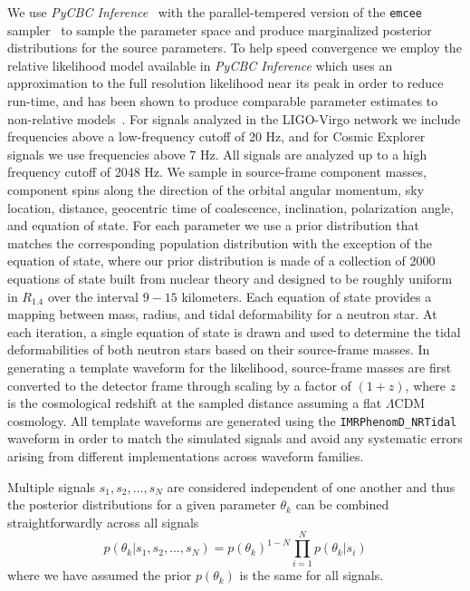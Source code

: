 We use \textit{PyCBC Inference}~\cite{Biwer_2019} with the parallel-tempered version of the \texttt{emcee} sampler~\cite{Foreman_Mackey_2013,Vousden_2015,2010CAMCS...5...65G} to sample the parameter space and produce marginalized posterior distributions for the source parameters. To help speed convergence we employ the relative likelihood model available in \textit{PyCBC Inference} which uses an approximation to the full resolution likelihood near its peak in order to reduce run-time, and has been shown to produce comparable parameter estimates to non-relative models~\cite{Cornish:2010kf,Zackay:2018qdy,Finstad:2020sok}. For signals analyzed in the LIGO-Virgo network we include frequencies above a low-frequency cutoff of 20 Hz, and for Cosmic Explorer signals we use frequencies above 7 Hz. All signals are analyzed up to a high frequency cutoff of 2048 Hz.
We sample in source-frame component masses, component spins along the direction of the orbital angular momentum, sky location, distance, geocentric time of coalescence, inclination, polarization angle, and equation of state. For each parameter we use a prior distribution that matches the corresponding population distribution with the exception of the equation of state, where our prior distribution is made of a collection of 2000 equations of state built from nuclear theory and designed to be roughly uniform in $R_{1.4}$ over the interval $9-15$ kilometers. Each equation of state provides a mapping between mass, radius, and tidal deformability for a neutron star. At each iteration, a single equation of state is drawn and used to determine the tidal deformabilities of both neutron stars based on their source-frame masses. In generating a template waveform for the likelihood, source-frame masses are first converted to the detector frame through scaling by a factor of $(1+z)$, where $z$ is the cosmological redshift at the sampled distance assuming a flat $\Lambda$CDM cosmology. All template waveforms are generated using the \texttt{IMRPhenomD\_NRTidal} waveform in order to match the simulated signals and avoid any systematic errors arising from different implementations across waveform families.


Multiple signals $s_{1},s_{2},\ldots,s_{N}$ are considered independent of one another and thus the posterior distributions for a given parameter $\theta_{k}$ can be combined straightforwardly across all signals~\cite{DelPozzo:2013ala,Agathos:2015uaa}
\begin{equation}
    p(\theta_{k}|s_{1},s_{2},\ldots,s_{N})=p(\theta_{k})^{1-N}\prod_{i=1}^{N} p(\theta_{k}|s_{i})
\end{equation}
where we have assumed the prior $p(\theta_{k})$ is the same for all signals. 

